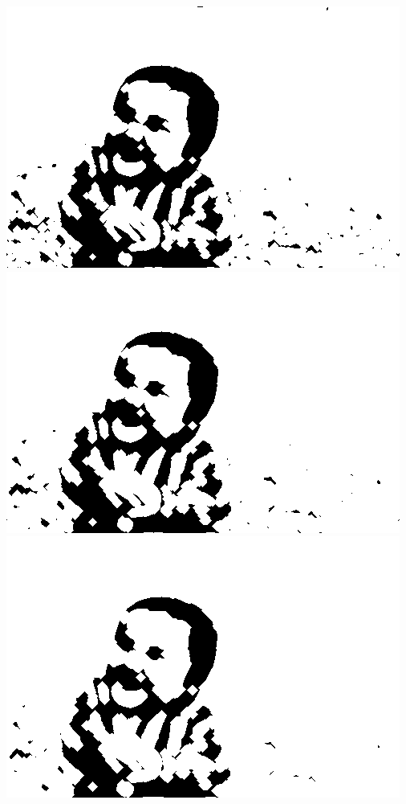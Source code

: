 \documentclass[a4paper,11pt]{article}
\begin{document}
\begin{center}
\includegraphics[scale=0.22]{babyd3e4.png}
\includegraphics[scale=0.22]{babyd3e5.png}
\includegraphics[scale=0.22]{babyd3e6.png}\\

\end{center}
\end{document}
